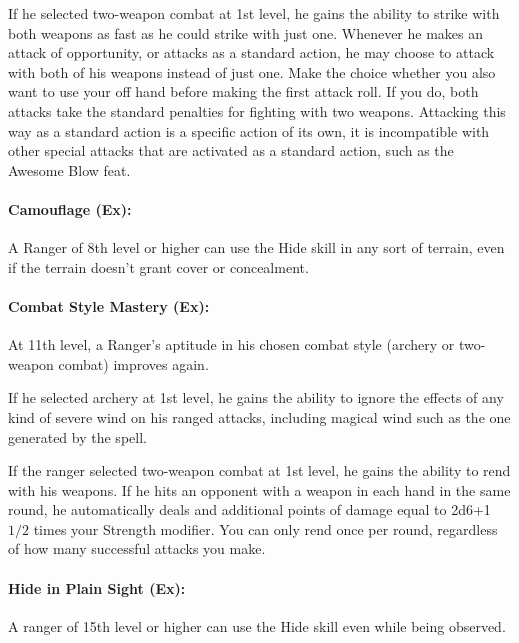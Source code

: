 If he selected two-weapon combat at 1st level, he gains the ability to strike with both weapons as fast as he could strike with just one.
Whenever he makes an attack of opportunity, or attacks as a standard action, he may choose to attack with both of his weapons instead of just one.
Make the choice whether you also want to use your off hand before making the first attack roll. If you do, both attacks take the standard penalties for fighting with two weapons.
Attacking this way as a standard action is a specific action of its own, it is incompatible with other special attacks that are activated as a standard action, such as the Awesome Blow feat.

\paragraph{Camouflage (Ex):}
A Ranger of 8th level or higher can use the Hide skill in any sort of terrain, even if the terrain doesn't grant cover or concealment.

\paragraph{Combat Style Mastery (Ex):}
At 11th level, a Ranger's aptitude in his chosen combat style (archery or two-weapon combat) improves again. 

If he selected archery at 1st level, he gains the ability to ignore the effects of any kind of severe wind on his ranged attacks, including magical wind such as the one generated by the  spell.

If the ranger selected two-weapon combat at 1st level, he gains the ability to rend with his weapons.
If he hits an opponent with a weapon in each hand in the same round, he automatically deals and additional points of damage equal to 2d6+1 $1/2$ times your Strength modifier. You can only rend once per round, regardless of how many successful attacks you make.
\paragraph{Hide in Plain Sight (Ex):}
A ranger of 15th level or higher can use the Hide skill even while being observed.

% 
% 





